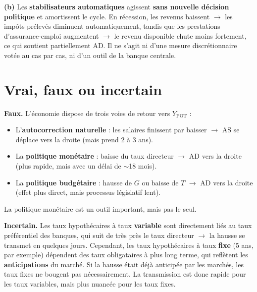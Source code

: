 \begin{reponse}
\textbf{(b)} Les \textbf{stabilisateurs automatiques} agissent \textbf{sans nouvelle décision politique} et amortissent le cycle. En récession, les revenus baissent $\to$ les impôts prélevés diminuent automatiquement, tandis que les prestations d'assurance-emploi augmentent $\to$ le revenu disponible chute moins fortement, ce qui soutient partiellement AD. Il ne s'agit ni d'une mesure discrétionnaire votée au cas par cas, ni d'un outil de la banque centrale.
\end{reponse}

\section{Vrai, faux ou incertain}

\setcounter{shortcounter}{0}



\begin{reponse}
\textbf{Faux.} L'économie dispose de trois voies de retour vers $Y_{\text{POT}}$ :
\begin{itemize}
   \item L'\textbf{autocorrection naturelle} : les salaires finissent par baisser $\to$ AS se déplace vers la droite (mais prend 2 à 3 ans).
   \item La \textbf{politique monétaire} : baisse du taux directeur $\to$ AD vers la droite (plus rapide, mais avec un délai de $\sim$18 mois).
   \item La \textbf{politique budgétaire} : hausse de $G$ ou baisse de $T$ $\to$ AD vers la droite (effet plus direct, mais processus législatif lent).
\end{itemize}
La politique monétaire est un outil important, mais pas le seul.
\end{reponse}



\begin{reponse}
\textbf{Incertain.} Les taux hypothécaires à taux \textbf{variable} sont directement liés au taux préférentiel des banques, qui suit de très près le taux directeur $\to$ la hausse se transmet en quelques jours. Cependant, les taux hypothécaires à taux \textbf{fixe} (5 ans, par exemple) dépendent des taux obligataires à plus long terme, qui reflètent les \textbf{anticipations} du marché. Si la hausse était déjà anticipée par les marchés, les taux fixes ne bougent pas nécessairement. La transmission est donc rapide pour les taux variables, mais plus nuancée pour les taux fixes.
\end{reponse}

